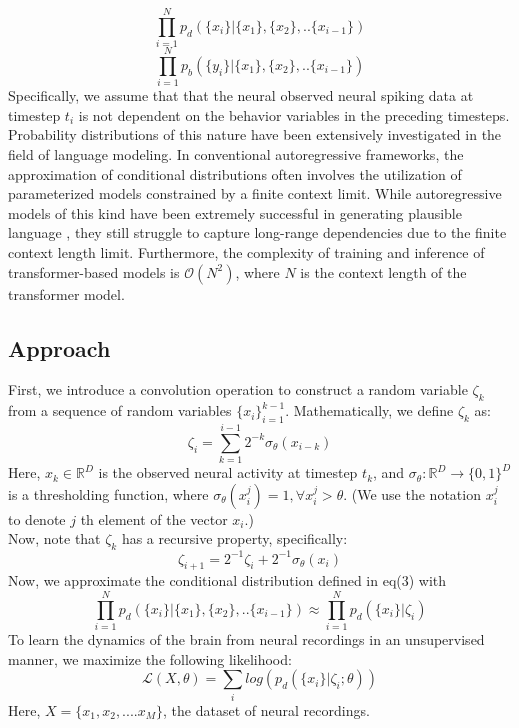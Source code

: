 \documentclass[12pt]{article}
\begin{document}
\begin{equation}
   \prod_{i=1}^{N} p_d(\{x_{i}\}| \{x_1\},\{x_2\},..\{x_{i-1}\})
\end{equation}
\begin{equation}
   \prod_{i=1}^{N} p_b(\{y_{i}\}| \{x_1\},\{x_2\},..\{x_{i-1}\})
\end{equation}
Specifically, we assume that that the neural observed neural spiking data at timestep $t_i$ is not dependent on the behavior variables in the preceding timesteps. Probability distributions of this nature have been extensively investigated in the field of language modeling. In conventional autoregressive frameworks, the approximation of conditional distributions often involves the utilization of parameterized models constrained by a finite context limit\cite{vaswani2017attention}. While autoregressive models of this kind have been extremely successful in generating plausible language \cite{radford2018improving}, they still struggle to capture long-range dependencies due to the finite context length limit\cite{hahn2020theoretical}. Furthermore, the complexity of training and inference of transformer-based models is $\mathcal{O}(N^2)$, where $N$ is the context length of the transformer model.\\




\subsection{Approach}

First, we introduce a convolution operation to construct a random variable $ \zeta_k $ from a sequence of random variables $\{x_i\}_{i=1}^{k- 1}$. Mathematically, we define $ \zeta_k $ as:
\begin{equation}
    \zeta_i = \sum_{k=1}^{i-1} 2^{-k} \sigma_{\theta}(x_{i-k}) 
\end{equation}
Here, $x_k \in \mathbb{R}^D$ is the observed neural activity at timestep $t_k$, and $\sigma_{\theta}: \mathbb{R}^D \rightarrow \{0,1\}^D $ is a thresholding function, where $\sigma_{\theta}(x_i^{j}) = 1, \forall x_i^{j} > \theta $. (We use the notation $x_i^{j}$ to denote $j$ th element of the vector $x_i$.)
\\

Now, note that $\zeta_k $ has a recursive property, specifically:
\begin{equation}
    \zeta_{i+1} = 2^{-1}\zeta_i +  2^{-1}\sigma_{\theta}(x_i)
\end{equation}
Now, we approximate the conditional distribution defined in eq(3) with 
\begin{equation}
   \prod_{i=1}^{N} p_d(\{x_{i}\}| \{x_1\},\{x_2\},..\{x_{i-1}\}) 
   \approx  \prod_{i=1}^{N} p_d(\{x_{i}\}|\zeta_i)
\end{equation}
To learn the dynamics of the brain from neural recordings in an unsupervised manner, we maximize the following likelihood:
\begin{equation}
    \mathcal{L}(X,\theta) = \sum_i log(p_d(\{x_{i}\}|\zeta_i;\theta))
\end{equation}
Here, $X = \{x_1,x_2,....x_M\}$, the dataset of neural recordings. \\
\end{document}
